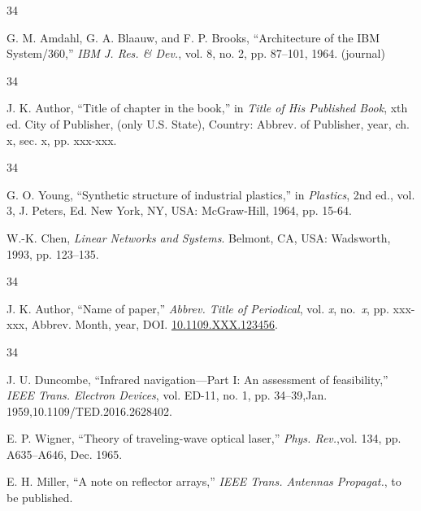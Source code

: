 \documentclass{IEEEojcsys}
\begin{document}
\def\refname{}
\begin{thebibliography}{34}\vspace*{-12pt}

\bibitem{[1]} G. M. Amdahl, G. A. Blaauw, and F. P. Brooks, ``Architecture of the IBM System/360,'' {\em IBM J. Res. \& Dev.}, vol. 8, no. 2, pp. 87--101, 1964. (journal)
\end{thebibliography}

\vspace*{-12pt}
\def\refname{}
\begin{thebibliography}{34}
\item[]\hskip-18pt J. K. Author, ``Title of chapter in the book,'' in {\em Title of His Published Book}, xth ed. City of Publisher, (only U.S. State), Country: Abbrev. of Publisher, year, ch. x, sec. x, pp. xxx-xxx.
\end{thebibliography}\vspace*{-12pt}

\def\refname{}
\begin{thebibliography}{34}\vspace*{-12pt}

\bibitem{}G. O. Young, ``Synthetic structure of industrial plastics,'' in {\em Plastics}, 2nd ed., vol. 3, J. Peters, Ed. New York, NY, USA: McGraw-Hill, 1964, pp. 15-64.

\bibitem{}W.-K. Chen, {\it Linear Networks and Systems}. Belmont, CA, USA: Wadsworth, 1993, pp. 123--135.

\end{thebibliography}

\vspace*{-12pt}

\begin{thebibliography}{34}
\item[]\hskip-18pt
J. K. Author, ``Name of paper,'' {\it Abbrev. Title of Periodical}, vol. {\it x},   no.~{\it x}, pp. xxx-xxx, Abbrev. Month, year, DOI. \href{https://dx.doi.org/10.1109.XXX.123456}{10.1109.XXX.123456}.
\end{thebibliography}\vspace*{-12pt}


\vspace*{-12pt}

\begin{thebibliography}{34}
\setcounter{enumiv}{2}

\bibitem{}J. U. Duncombe, ``Infrared navigation---Part I: An assessment of feasibility,'' {\em IEEE Trans. Electron Devices}, vol. ED-11, no. 1, pp. 34--39,\break Jan. 1959,10.1109/TED.2016.2628402.

\bibitem{}E. P. Wigner, ``Theory of traveling-wave optical laser,''
{\em Phys. Rev.},\break  vol. 134, pp. A635--A646, Dec. 1965. %

\bibitem{}E. H. Miller, ``A note on reflector arrays,'' {\em IEEE Trans. Antennas Propagat.}, to be published.
\end{thebibliography}
\end{document}
